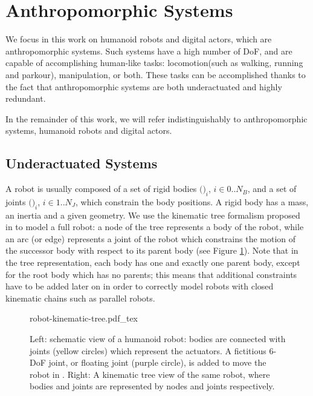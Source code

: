 \section{Anthropomorphic Systems}
\label{sec:chap1-anthropomorphic-systems}

We focus in this work on humanoid robots and digital actors, which are
anthropomorphic systems. Such systems have a high number of DoF, and
are capable of accomplishing human-like tasks: locomotion(such as
walking, running and parkour), manipulation, or both. These tasks can
be accomplished thanks to the fact that anthropomorphic systems are
both underactuated and highly redundant.

In the remainder of this work, we will refer indistinguishably to
anthropomorphic systems, humanoid robots and digital actors.

\subsection{Underactuated Systems}
\label{subsec:chap1-underactuated-systems}

A robot {\robot} is usually composed of a set of rigid bodies
$($$)_i$, $i \in 0..N_B$, and a set of joints
$($$)_i$, $i \in 1..N_J$, which constrain the body
positions. A rigid body has a mass, an inertia and a given
geometry. We use the kinematic tree formalism proposed in
\cite{feat08} to model a full robot: a node of the tree represents a
body of the robot, while an arc (or edge) represents a joint 
of the robot which constrains the motion of the successor body
 with respect to its parent body  (see
Figure \ref{fig:chap1-robot-kinematic-tree}). Note that in the tree
representation, each body has one and exactly one parent body, except
for the root body which has no parents; this means that additional
constraints have to be added later on in order to correctly model
robots with closed kinematic chains such as parallel robots.

\begin{figure}
  \centering
      {\def\svgwidth{0.8\linewidth}
        
                   {robot-kinematic-tree.pdf_tex}}
      \caption{Left: schematic view of a humanoid robot: bodies
        are connected with joints (yellow circles) which represent the
        actuators. A fictitious 6-DoF joint, or floating joint (purple
        circle), is added to move the robot in {\segroup}. Right: A
        kinematic tree view of the same robot, where bodies and joints
        are represented by nodes and joints respectively.}
      \label{fig:chap1-robot-kinematic-tree}
\end{figure}

